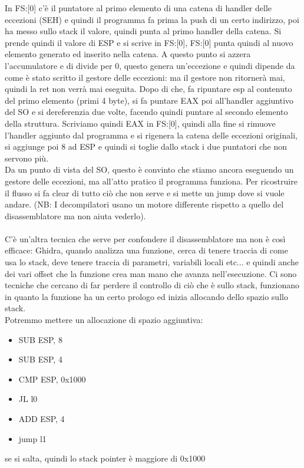 \documentclass[12pt, oneside]{extbook}
\begin{document}
In FS:[0] c'è il puntatore al primo elemento di una catena di handler delle eccezioni (SEH) e quindi il programma fa prima la push di un certo indirizzo, poi ha messo sullo stack il valore, quindi punta al primo handler della catena. Si prende quindi il valore di ESP e si scrive in FS:[0], FS:[0] punta quindi al nuovo elemento generato ed inserito nella catena. A questo punto si azzera l'accumulatore e di divide per 0, questo genera un'eccezione e quindi dipende da come è stato scritto il gestore delle eccezioni: ma il gestore non ritornerà mai, quindi la ret non verrà mai eseguita. Dopo di che, fa ripuntare esp al contenuto del primo elemento (primi 4 byte), si fa puntare EAX poi all'handler aggiuntivo del SO e si dereferenzia due volte, facendo quindi puntare al secondo elemento della struttura. Scriviamo quindi EAX in FS:[0], quindi alla fine si rimuove l'handler aggiunto dal programma e si rigenera la catena delle eccezioni originali, si aggiunge poi 8 ad ESP e quindi si toglie dallo stack i due puntatori che non servono più.\\Da un punto di vista del SO, questo è convinto che stiamo ancora eseguendo un gestore delle eccezioni, ma all'atto pratico il programma funziona. Per ricostruire il flusso si fa clear di tutto ciò che non serve e si mette un jump dove si vuole andare. (NB: I decompilatori usano un motore differente rispetto a quello del disassemblatore ma non aiuta vederlo).\\\\C'è un'altra tecnica che serve per confondere il disassemblatore ma non è così efficace: Ghidra, quando analizza una funzione, cerca di tenere traccia di come usa lo stack, deve tenere traccia di parametri, variabili locali etc... e quindi anche dei vari offset che la funzione crea man mano che avanza nell'esecuzione. Ci sono tecniche che cercano di far perdere il controllo di ciò che è sullo stack, funzionano in quanto la funzione ha un certo prologo ed inizia allocando dello spazio sullo stack.\\ Potremmo mettere un allocazione di spazio aggiuntiva:
\begin{itemize}
\item SUB ESP, 8
\item SUB ESP, 4
\item CMP ESP, 0x1000
\item JL l0
\item ADD ESP, 4
\item jump l1
\end{itemize}
se si salta, quindi lo stack pointer è maggiore di 0x1000
\end{document}
